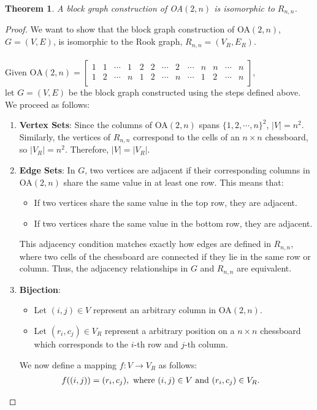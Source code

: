 \documentclass{article}
\newtheorem{theorem}{Theorem}
\begin{document}
\begin{theorem}
    A block graph construction of OA\((2,n)\) is isomorphic to \(R_{n,n}\).
\end{theorem}

\begin{proof} 
We want to show that the block graph construction of OA\((2,n)\), \(G = (V,E)\), is isomorphic to the Rook graph, \(R_{n,n} = (V_R, E_R)\). \\ \\
Given 
\(
\text{OA}(2, n) = \begin{bmatrix}
    1 & 1 & \cdots & 1 & 2 & 2 & \cdots & 2 & \cdots & n & n & \cdots & n \\
    1 & 2 & \cdots & n & 1 & 2 & \cdots & n & \cdots & 1 & 2 & \cdots & n \\
\end{bmatrix},
\) \\
let $G = (V,E)$ be the block graph constructed using the steps defined above. \\

We proceed as follows:
\begin{enumerate}
    \item \textbf{Vertex Sets}: 
    Since the columns of OA\((2,n)\) spans \(\{1,2,\cdots,n\}^2\), \(|V| = n^2\). Similarly, the vertices of \(R_{n,n}\) correspond to the cells of an \(n \times n\) chessboard, so \(|V_R| = n^2\). Therefore, \(|V| = |V_R|\).

    \item \textbf{Edge Sets}: 
    In \(G\), two vertices are adjacent if their corresponding columns in OA\((2,n)\) share the same value in at least one row. This means that:
    \begin{itemize}
        \item If two vertices share the same value in the top row, they are adjacent.
        \item If two vertices share the same value in the bottom row, they are adjacent.
    \end{itemize}
    This adjacency condition matches exactly how edges are defined in \(R_{n,n}\), where two cells of the chessboard are connected if they lie in the same row or column. Thus, the adjacency relationships in \(G\) and \(R_{n,n}\) are equivalent.

    \item \textbf{Bijection}: 
    
    \begin{itemize}
        \item Let \((i,j) \in V\) represent an arbitrary column in OA\((2,n)\).
        \item Let \((r_i,c_j) \in V_R\) represent a arbitrary position on a \(n\times n\) chessboard which corresponds to the \(i\)-th row and \(j\)-th column.
    \end{itemize}
    We now define a mapping \(f: V \to V_R\) as follows:
    \begin{align*}
        f((i,j)) &= (r_i,c_j), \text{  where \( (i,j) \in V \) and \((r_i,c_j) \in V_R\). }
    \end{align*}
    

\end{enumerate}
\end{proof}
\end{document}
